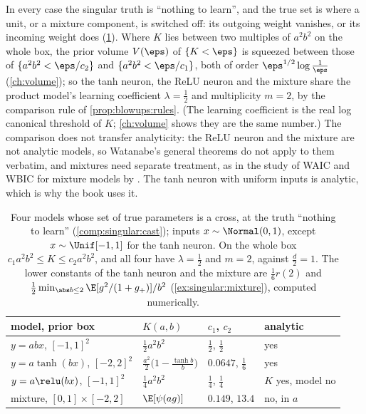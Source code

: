 \begin{refsection}
In every case the singular truth is ``nothing to learn'', and the true set is where a unit, or a mixture component, is switched off: its outgoing weight vanishes, or its incoming weight does (\cref{tab:singular:cast}). Where $K$ lies between two multiples of $a^2b^2$ on the whole box, the prior volume $V(\eps)$ of $\{K<\eps\}$ is squeezed between those of $\{a^2b^2<\eps/c_2\}$ and $\{a^2b^2<\eps/c_1\}$, both of order $\eps^{1/2}\log\frac1\eps$ (\cref{ch:volume}); so the tanh neuron, the ReLU neuron and the mixture share the product model's learning coefficient $\lambda=\frac12$ and multiplicity $m=2$, by the comparison rule of \cref{prop:blowups:rules}. (The learning coefficient is the real log canonical threshold of $K$; \cref{ch:volume} shows they are the same number.) The comparison does not transfer analyticity: the ReLU neuron and the mixture are not analytic models, so Watanabe's general theorems do not apply to them verbatim, and mixtures need separate treatment, as in the study of WAIC and WBIC for mixture models by \textcite{Watanabe2021}. The tanh neuron with uniform inputs is analytic, which is why the book uses it.

\begin{table}[t]
\centering\footnotesize
\begin{tabular}{@{}llll@{}}
\toprule
model, prior box & $K(a,b)$ & $c_1$, $c_2$ & analytic\\
\midrule
$y=abx$, $[-1,1]^2$ & $\frac12a^2b^2$ & $\frac12$, $\frac12$ & yes\\
$y=a\tanh(bx)$, $[-2,2]^2$ & $\frac{a^2}2\bigl(1-\frac{\tanh b}b\bigr)$ & $0.0647$, $\frac16$ & yes\\
$y=a\relu(bx)$, $[-1,1]^2$ & $\frac14a^2b^2$ & $\frac14$, $\frac14$ & $K$ yes, model no\\
mixture, $[0,1]\times[-2,2]$ & $\E[\psi(ag)]$ & $0.149$, $13.4$ & no, in $a$\\
\bottomrule
\end{tabular}
\caption{Four models whose set of true parameters is a cross, at the truth ``nothing to learn'' (\cref{comp:singular:cast}); inputs $x\sim\Normal(0,1)$, except $x\sim\Unif[-1,1]$ for the tanh neuron. On the whole box $c_1a^2b^2\le K\le c_2a^2b^2$, and all four have $\lambda=\frac12$ and $m=2$, against $\frac d2=1$. The lower constants of the tanh neuron and the mixture are $\frac16r(2)$ and $\frac12\min_{\abs b\le2}\E[g^2/(1+g_+)]/b^2$ (\cref{ex:singular:mixture}), computed numerically.}\label{tab:singular:cast}
\end{table}


\end{refsection}
